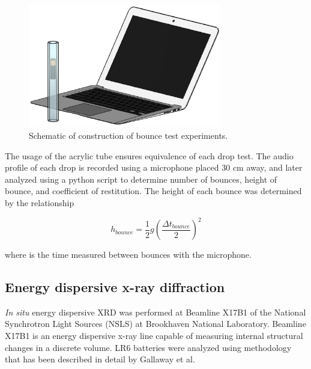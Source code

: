 \begin{figure}[htb]
  \centering
    \includegraphics[width=0.75\textwidth]{ch3-dbb/Images/Setup.eps}
    \caption[Schematic of bounce test experiments.]{Schematic of construction of bounce test experiments.}
    \label{fig:expschem}
\end{figure}

The usage of the acrylic tube ensures equivalence of each drop test. The audio profile of each drop is recorded using a microphone placed 30 cm away, and later analyzed using a python script to determine number of bounces, height of bounce, and coefficient of restitution. The height of each bounce was determined by the relationship

\begin{equation}
h_{bounce}= \frac{1}{2}g(\frac{\Delta t_{bounce}}{2})^2
\label{eq:bounce}
\end{equation}

\noindent where {} is the time measured between bounces with the microphone.

\subsection{Energy dispersive x-ray diffraction}

\textit{In situ} energy dispersive XRD was performed at Beamline X17B1 of the National Synchrotron Light Sources (NSLS) at Brookhaven National Laboratory.  Beamline X17B1 is an energy dispersive x-ray line capable of measuring internal structural changes in a discrete volume. LR6 batteries were analyzed using methodology that has been described in detail by Gallaway et al.~\cite{gallaway}